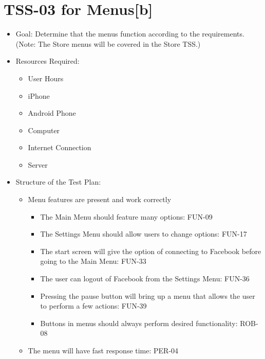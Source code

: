 \section{TSS-03 for Menus{[}b{]} }
\begin{itemize}
\item Goal: Determine that the menus function according to the requirements.
(Note: The Store menus will be covered in the Store TSS.)
\item Resources Required: 

\begin{itemize}
\item User Hours 
\item iPhone 
\item Android Phone 
\item Computer 
\item Internet Connection 
\item Server
\end{itemize}
\item Structure of the Test Plan: 

\begin{itemize}
\item Menu features are present and work correctly 

\begin{itemize}
\item The Main Menu should feature many options: FUN-09 
\item The Settings Menu should allow users to change options: FUN-17 
\item The start screen will give the option of connecting to Facebook before
going to the Main Menu: FUN-33 
\item The user can logout of Facebook from the Settings Menu: FUN-36 
\item Pressing the pause button will bring up a menu that allows the user
to perform a few actions: FUN-39 
\item Buttons in menus should always perform desired functionality: ROB-08 
\end{itemize}
\item The menu will have fast response time: PER-04
\end{itemize}
\end{itemize}

